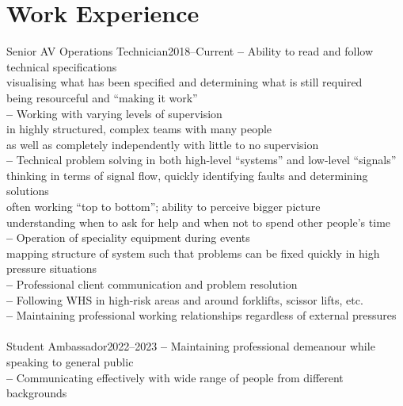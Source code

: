 \section{Work Experience}
    {Senior AV Operations Technician}{2018--Current}{
      \textbf{--} Ability to read and follow technical specifications \\
        \hspace{18pt} visualising what has been specified and determining what is still required \\
        \hspace{18pt} being resourceful and ``making it work'' \\
      \textbf{--} Working with varying levels of supervision \\
        \hspace{18pt} in highly structured, complex teams with many people \\
        \hspace{18pt} as well as completely independently with little to no supervision \\
      \textbf{--} Technical problem solving in both high-level ``systems'' and low-level ``signals'' \\
        \hspace{18pt} thinking in terms of signal flow, quickly identifying faults and determining solutions \\
        \hspace{18pt} often working ``top to bottom''; ability to perceive bigger picture \\
        \hspace{18pt} understanding when to ask for help and when not to spend other people's time \\
      \textbf{--} Operation of speciality equipment during events \\
        \hspace{18pt} mapping structure of system such that problems can be fixed quickly in high pressure situations \\
      \textbf{--} Professional client communication and problem resolution \\
      \textbf{--} Following WHS in high-risk areas and around forklifts, scissor lifts, etc. \\
      \textbf{--} Maintaining professional working relationships regardless of external pressures
    }
\\\\
    {Student Ambassador}{2022--2023}{
      \textbf{--} Maintaining professional demeanour while speaking to general public \\
      \textbf{--} Communicating effectively with wide range of people from different backgrounds \\
    }
